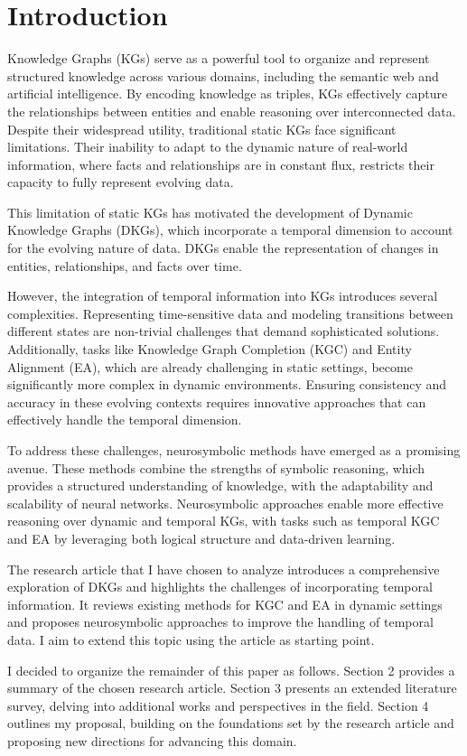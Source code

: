 \section{Introduction}

Knowledge Graphs (KGs) \cite{hogan2021} serve as a powerful tool to organize and represent structured knowledge across various domains, including the semantic web and artificial intelligence. By encoding knowledge as triples, KGs effectively capture the relationships between entities and enable reasoning over interconnected data. Despite their widespread utility, traditional static KGs face significant limitations. Their inability to adapt to the dynamic nature of real-world information, where facts and relationships are in constant flux, restricts their capacity to fully represent evolving data. 

This limitation of static KGs has motivated the development of Dynamic Knowledge Graphs (DKGs), which incorporate a temporal dimension to account for the evolving nature of data. DKGs enable the representation of changes in entities, relationships, and facts over time.

However, the integration of temporal information into KGs introduces several complexities. Representing time-sensitive data and modeling transitions between different states are non-trivial challenges that demand sophisticated solutions. Additionally, tasks like Knowledge Graph Completion (KGC) and Entity Alignment (EA), which are already challenging in static settings, become significantly more complex in dynamic environments. Ensuring consistency and accuracy in these evolving contexts requires innovative approaches that can effectively handle the temporal dimension.

To address these challenges, neurosymbolic methods have emerged as 
a promising avenue. These methods combine the strengths of symbolic reasoning, which provides a structured understanding of knowledge, with the adaptability and scalability 
of neural networks. Neurosymbolic approaches enable more effective reasoning over dynamic and temporal KGs, with tasks such as temporal KGC and EA by leveraging both logical structure and data-driven learning.

The research article \cite{alam2024} that I have chosen to analyze introduces a comprehensive exploration of DKGs and highlights the challenges of incorporating temporal information. It reviews existing methods for KGC and EA in dynamic settings and proposes neurosymbolic approaches to improve the handling of temporal data. I aim to extend this topic using the article as starting point.

I decided to organize the remainder of this paper as follows. Section 2 provides a summary of the chosen research article. Section 3 presents an extended literature survey, delving into additional works and perspectives in the field. Section 4 outlines my proposal, building on the foundations set by the research article and proposing new directions for advancing this domain.